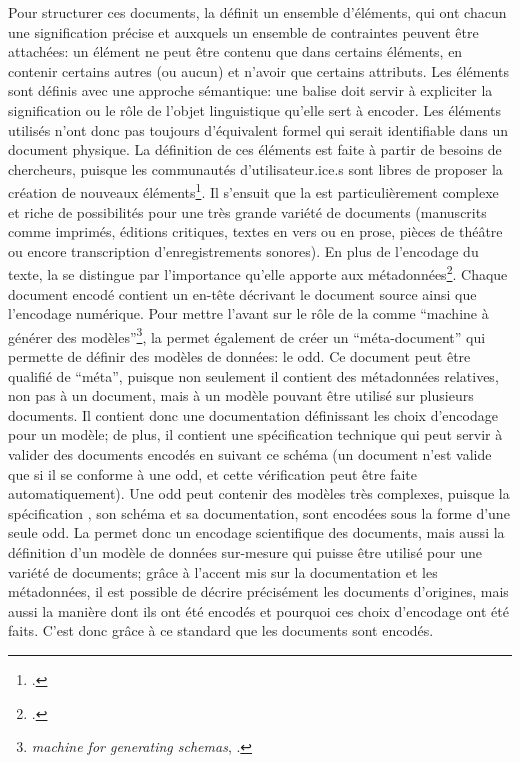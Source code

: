Pour structurer ces documents, la \tei{} définit un ensemble d'éléments, qui ont chacun une signification précise et auxquels un ensemble de contraintes peuvent être attachées: un élément ne peut être contenu que dans certains éléments, en contenir certains autres (ou aucun) et n'avoir que certains attributs. Les éléments sont définis avec une approche sémantique: une balise doit servir à expliciter la signification ou le rôle de l'objet linguistique qu'elle sert à encoder. Les éléments utilisés n'ont donc pas toujours d'équivalent formel qui serait identifiable dans un document physique. La définition de ces éléments est faite à partir de besoins de chercheurs, puisque les communautés d'utilisateur.ice.s sont libres de proposer la création de nouveaux éléments\footcite[p. 110]{burnard_how_2019}. Il s'ensuit que la \tei{} est particulièrement complexe et riche de possibilités pour une très grande variété de documents (manuscrits comme imprimés, éditions critiques, textes en vers ou en prose, pièces de théâtre ou encore transcription d'enregistrements sonores). En plus de l'encodage du texte, la \tei{} se distingue par l'importance qu'elle apporte aux métadonnées\footcite[p. 104]{burnard_how_2019}. Chaque document encodé contient un en-tête décrivant le document source ainsi que l'encodage numérique. Pour mettre l'avant sur le rôle de la \tei{} comme \enquote{machine à générer des modèles}\footnote{\textit{machine for generating schemas}, \cite[§ 30]{burnard_what_2019}.}, la \tei{} permet également de créer un \enquote{méta-document} \xml{} qui permette de définir des modèles de données: le \gls{odd}. Ce document peut être qualifié de \enquote{méta}, puisque non seulement il contient des métadonnées relatives, non pas à un document, mais à un modèle pouvant être utilisé sur plusieurs documents. Il contient donc une documentation définissant les choix d'encodage pour un modèle; de plus, il contient une spécification technique qui peut servir à valider des documents encodés en suivant ce schéma (un document \tei{} n'est valide que si il se conforme à une \gls{odd}, et cette vérification peut être faite automatiquement). Une \gls{odd} peut contenir des modèles très complexes, puisque la spécification \tei{}, son schéma et sa documentation, sont encodées sous la forme d'une seule \gls{odd}. La \tei{} permet donc un encodage scientifique des documents, mais aussi la définition d'un modèle de données sur-mesure qui puisse être utilisé pour une variété de documents; grâce à l'accent mis sur la documentation et les métadonnées, il est possible de décrire précisément les documents d'origines, mais aussi la manière dont ils ont été encodés et pourquoi ces choix d'encodage ont été faits. C'est donc grâce à ce standard que les documents sont encodés.

